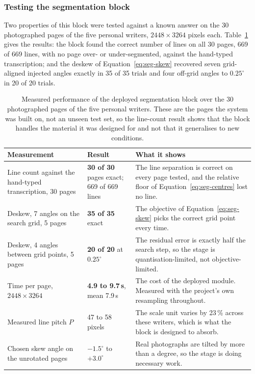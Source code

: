 \subsubsection{Testing the segmentation block}
\label{sec:seg-test}

Two properties of this block were tested against a known answer on the 30 photographed pages of the five personal writers, $2448\times3264$ pixels each. Table~\ref{tab:seg-test} gives the results: the block found the correct number of lines on all 30 pages, 669 of 669 lines, with no page over- or under-segmented, against the hand-typed transcription; and the deskew of Equation~\ref{eq:seg-skew} recovered seven grid-aligned injected angles exactly in 35 of 35 trials and four off-grid angles to $0.25^\circ$ in 20 of 20 trials.

\begin{table}[h]
\centering
\fontsize{9}{11}\selectfont
\setlength{\tabcolsep}{4pt}
\begin{tabularx}{\linewidth}{|p{4.3cm}|p{3.3cm}|X|}
\hline
\textbf{Measurement} & \textbf{Result} & \textbf{What it shows} \\
\hline
Line count against the hand-typed transcription, 30 pages & \textbf{30 of 30} pages exact; 669 of 669 lines & The line separation is correct on every page tested, and the relative floor of Equation~\ref{eq:seg-centres} lost no line. \\
\hline
Deskew, 7 angles on the search grid, 5 pages & \textbf{35 of 35} exact & The objective of Equation~\ref{eq:seg-skew} picks the correct grid point every time. \\
\hline
Deskew, 4 angles between grid points, 5 pages & \textbf{20 of 20} at $0.25^\circ$ & The residual error is exactly half the search step, so the stage is quantisation-limited, not objective-limited. \\
\hline
Time per page, $2448\times3264$ & \textbf{4.9 to 9.7\,s}, mean 7.9\,s & The cost of the deployed module. Measured with the project's own resampling throughout. \\
\hline
Measured line pitch $P$ & 47 to 58 pixels & The scale unit varies by 23\,\% across these writers, which is what the block is designed to absorb. \\
\hline
Chosen skew angle on the unrotated pages & $-1.5^\circ$ to $+3.0^\circ$ & Real photographs are tilted by more than a degree, so the stage is doing necessary work. \\
\hline
\end{tabularx}
\caption{Measured performance of the deployed segmentation block over the 30 photographed pages of the five personal writers. These are the pages the system was built on, not an unseen test set, so the line-count result shows that the block handles the material it was designed for and not that it generalises to new conditions.}
\label{tab:seg-test}
\end{table}

